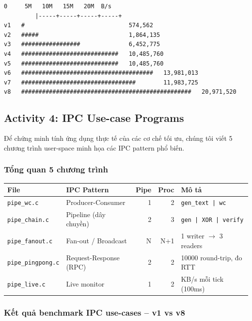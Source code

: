 \documentclass[11pt,a4paper]{article}
\begin{document}
\begin{lstlisting}[style=plain]
         0     5M   10M   15M   20M  B/s
         |-----+-----+-----+-----+
v1   #                              574,562
v2   #####                          1,864,135
v3   #################              6,452,775
v4   ############################   10,485,760
v5   ############################   10,485,760
v6   ######################################   13,981,013
v7   #################################        11,983,725
v8   #################################################   20,971,520
\end{lstlisting}

\subsection{Activity 4: IPC Use-case Programs}

Để chứng minh tính ứng dụng thực tế của các cơ chế tối ưu, chúng tôi viết 5 chương trình user-space minh họa các IPC pattern phổ biến.

\subsubsection{Tổng quan 5 chương trình}

\begin{center}
\begin{tabularx}{\linewidth}{lXrrl}
\toprule
\textbf{File} & \textbf{IPC Pattern} & \textbf{Pipe} & \textbf{Proc} & \textbf{Mô tả} \\
\midrule
\texttt{pipe\_wc.c}       & Producer-Consumer        & 1 & 2   & \texttt{gen\_text | wc} \\
\texttt{pipe\_chain.c}    & Pipeline (dây chuyền)    & 2 & 3   & \texttt{gen | XOR | verify} \\
\texttt{pipe\_fanout.c}   & Fan-out / Broadcast      & N & N+1 & 1 writer $\rightarrow$ 3 readers \\
\texttt{pipe\_pingpong.c} & Request-Response (RPC)   & 2 & 2   & 10000 round-trip, đo RTT \\
\texttt{pipe\_live.c}     & Live monitor             & 1 & 2   & KB/s mỗi tick (100ms) \\
\bottomrule
\end{tabularx}
\end{center}

\subsubsection{Kết quả benchmark IPC use-cases -- v1 vs v8}
\end{document}

